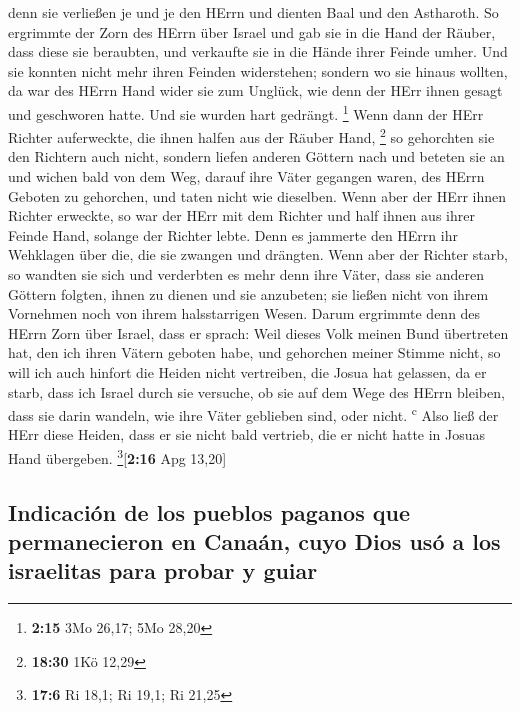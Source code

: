  denn sie verließen je und je den HErrn und dienten Baal
und den Astharoth.  So ergrimmte der Zorn des HErrn über
Israel und gab sie in die Hand der Räuber, dass diese sie beraubten, und
verkaufte sie in die Hände ihrer Feinde umher. Und sie konnten nicht
mehr ihren Feinden widerstehen;  sondern wo sie hinaus
wollten, da war des HErrn Hand wider sie zum Unglück, wie denn der HErr
ihnen gesagt und geschworen hatte. Und sie wurden hart gedrängt.
\footnote{\textbf{2:15} 3Mo 26,17; 5Mo 28,20}  Wenn dann
der HErr Richter auferweckte, die ihnen halfen aus der Räuber Hand,
\footnote{\textbf{18:30} 1Kö 12,29}  so gehorchten sie
den Richtern auch nicht, sondern liefen anderen Göttern nach und beteten
sie an und wichen bald von dem Weg, darauf ihre Väter gegangen waren,
des HErrn Geboten zu gehorchen, und taten nicht wie dieselben.
 Wenn aber der HErr ihnen Richter erweckte, so war der
HErr mit dem Richter und half ihnen aus ihrer Feinde Hand, solange der
Richter lebte. Denn es jammerte den HErrn ihr Wehklagen über die, die
sie zwangen und drängten.  Wenn aber der Richter starb,
so wandten sie sich und verderbten es mehr denn ihre Väter, dass sie
anderen Göttern folgten, ihnen zu dienen und sie anzubeten; sie ließen
nicht von ihrem Vornehmen noch von ihrem halsstarrigen Wesen.
 Darum ergrimmte denn des HErrn Zorn über Israel, dass er
sprach: Weil dieses Volk meinen Bund übertreten hat, den ich ihren
Vätern geboten habe, und gehorchen meiner Stimme nicht, 
so will ich auch hinfort die Heiden nicht vertreiben, die Josua hat
gelassen, da er starb,  dass ich Israel durch sie
versuche, ob sie auf dem Wege des HErrn bleiben, dass sie darin wandeln,
wie ihre Väter geblieben sind, oder nicht. \textsuperscript{c}
 Also ließ der HErr diese Heiden, dass er sie nicht bald
vertrieb, die er nicht hatte in Josuas Hand übergeben.
\footnote{\textbf{17:6} Ri 18,1; Ri 19,1; Ri 21,25}{[}\textbf{2:16} Apg
13,20{]}

\hypertarget{indicaciuxf3n-de-los-pueblos-paganos-que-permanecieron-en-canauxe1n-cuyo-dios-usuxf3-a-los-israelitas-para-probar-y-guiar}{%
\subsection{Indicación de los pueblos paganos que permanecieron en
Canaán, cuyo Dios usó a los israelitas para probar y
guiar}\label{indicaciuxf3n-de-los-pueblos-paganos-que-permanecieron-en-canauxe1n-cuyo-dios-usuxf3-a-los-israelitas-para-probar-y-guiar}}

